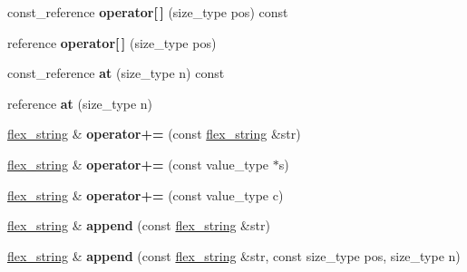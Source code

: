 \begin{DoxyCompactItemize}
\item 
\hypertarget{classflex__string_a8d0f232658eca24088b530541386fb6d}{}const\+\_\+reference {\bfseries operator\mbox{[}$\,$\mbox{]}} (size\+\_\+type pos) const \label{classflex__string_a8d0f232658eca24088b530541386fb6d}

\item 
\hypertarget{classflex__string_a3ec911801500cc3687b0c5703d12fdca}{}reference {\bfseries operator\mbox{[}$\,$\mbox{]}} (size\+\_\+type pos)\label{classflex__string_a3ec911801500cc3687b0c5703d12fdca}

\item 
\hypertarget{classflex__string_a076f6c73fd9eafd4378cb37e690bc42b}{}const\+\_\+reference {\bfseries at} (size\+\_\+type n) const \label{classflex__string_a076f6c73fd9eafd4378cb37e690bc42b}

\item 
\hypertarget{classflex__string_a904084287c3f438772d2d251a70d15e5}{}reference {\bfseries at} (size\+\_\+type n)\label{classflex__string_a904084287c3f438772d2d251a70d15e5}

\item 
\hypertarget{classflex__string_ae72d573ea35d592fff2eb3d6a877bf19}{}\hyperlink{classflex__string}{flex\+\_\+string} \& {\bfseries operator+=} (const \hyperlink{classflex__string}{flex\+\_\+string} \&str)\label{classflex__string_ae72d573ea35d592fff2eb3d6a877bf19}

\item 
\hypertarget{classflex__string_af6c5fdfa05ba7df599288fa867656f9a}{}\hyperlink{classflex__string}{flex\+\_\+string} \& {\bfseries operator+=} (const value\+\_\+type $\ast$s)\label{classflex__string_af6c5fdfa05ba7df599288fa867656f9a}

\item 
\hypertarget{classflex__string_a877453894a291e6a776f0c714d936841}{}\hyperlink{classflex__string}{flex\+\_\+string} \& {\bfseries operator+=} (const value\+\_\+type c)\label{classflex__string_a877453894a291e6a776f0c714d936841}

\item 
\hypertarget{classflex__string_a92a83736280501f1a452221185eade6f}{}\hyperlink{classflex__string}{flex\+\_\+string} \& {\bfseries append} (const \hyperlink{classflex__string}{flex\+\_\+string} \&str)\label{classflex__string_a92a83736280501f1a452221185eade6f}

\item 
\hypertarget{classflex__string_aced9e4a3440eda7e83e4b73f3d7af9c5}{}\hyperlink{classflex__string}{flex\+\_\+string} \& {\bfseries append} (const \hyperlink{classflex__string}{flex\+\_\+string} \&str, const size\+\_\+type pos, size\+\_\+type n)\label{classflex__string_aced9e4a3440eda7e83e4b73f3d7af9c5}


\end{DoxyCompactItemize}

